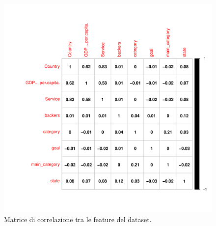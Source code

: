 \begin{figure}
	\centering
	\includegraphics[width=1\linewidth]{../FinalResults/Images/Data_exploration_plots/corrplot}
	\caption{Matrice di correlazione tra le feature del dataset.}
	\label{fig:corrplot}
\end{figure}
\newpage
